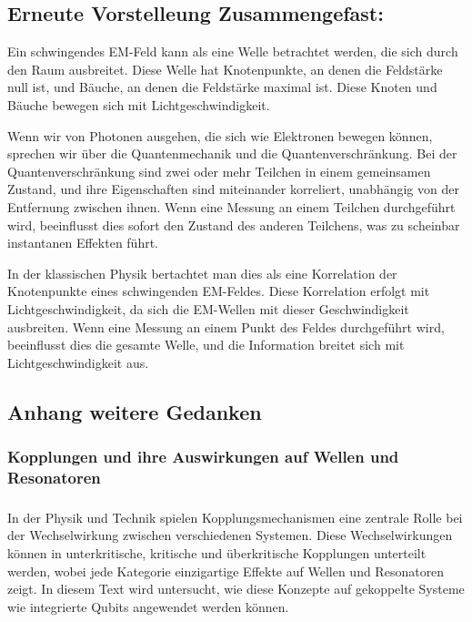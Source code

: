 \documentclass[12pt,a4paper]{article}
\begin{document}
	
	
	
	
	\begin{flushleft}
		\subsection{		Erneute Vorstelleung Zusammengefast:}
	\end{flushleft}
	Ein schwingendes EM-Feld kann als eine Welle betrachtet werden, die sich durch den Raum ausbreitet. Diese Welle hat Knotenpunkte, an denen die Feldstärke null ist, und Bäuche, an denen die Feldstärke maximal ist. Diese Knoten und Bäuche bewegen sich mit Lichtgeschwindigkeit.
	
	Wenn wir von Photonen ausgehen, die sich wie Elektronen bewegen können, sprechen wir über die Quantenmechanik und die Quantenverschränkung. Bei der Quantenverschränkung sind zwei oder mehr Teilchen in einem gemeinsamen Zustand, und ihre Eigenschaften sind miteinander korreliert, unabhängig von der Entfernung zwischen ihnen. Wenn eine Messung an einem Teilchen durchgeführt wird, beeinflusst dies sofort den Zustand des anderen Teilchens, was zu scheinbar instantanen Effekten führt.
	
	In der klassischen Physik bertachtet man dies als eine Korrelation der Knotenpunkte eines schwingenden EM-Feldes. Diese Korrelation erfolgt mit Lichtgeschwindigkeit, da sich die EM-Wellen mit dieser Geschwindigkeit ausbreiten. Wenn eine Messung an einem Punkt des Feldes durchgeführt wird, beeinflusst dies die gesamte Welle, und die Information breitet sich mit Lichtgeschwindigkeit aus.
	
	
	
	\subsection{Anhang weitere Gedanken}
	
	\subsubsection{Kopplungen und ihre Auswirkungen auf Wellen und Resonatoren}
	
	\subsubsection{}
	In der Physik und Technik spielen Kopplungsmechanismen eine zentrale Rolle bei der Wechselwirkung zwischen verschiedenen Systemen. Diese Wechselwirkungen können in unterkritische, kritische und überkritische Kopplungen unterteilt werden, wobei jede Kategorie einzigartige Effekte auf Wellen und Resonatoren zeigt. In diesem Text wird untersucht, wie diese Konzepte auf gekoppelte Systeme wie integrierte Qubits angewendet werden können.
	
\end{document}
